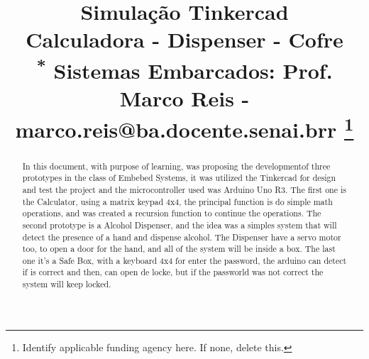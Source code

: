\documentclass[conference]{IEEEtran}
\begin{document}
\title{Simulação Tinkercad\\ Calculadora - Dispenser - Cofre\\
{\footnotesize \textsuperscript{*} Sistemas Embarcados: Prof. Marco Reis - marco.reis@ba.docente.senai.brr}
\thanks{Identify applicable funding agency here. If none, delete this.}
}



\author{
\and

}

\maketitle

\begin{abstract}
In this document, with purpose of learning, was proposing the developmentof three prototypes in the class of Embebed Systems,
it was utilized the Tinkercad for design and test the project and the microcontroller used
was Arduino Uno R3. The first one is the Calculator, using a matrix keypad 4x4,
the principal function is do simple math operations, and was created a recursion function
to continue the operations. The second prototype is a Alcohol Dispenser, and the idea was a
simples system that will detect the presence of a hand and dispense alcohol.
The Dispenser have a servo motor too, to open a door for the hand, and all of the system 
will be inside a box. The last one it's a Safe Box, with a keyboard 4x4 for enter the password, 
the arduino can detect if is correct and then, can open de locke, but if the passworld was not correct
the system will keep locked.
\end{abstract}
\end{document}
